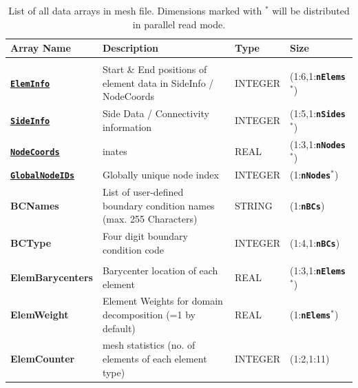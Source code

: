 \documentclass[a4paper,headsepline]{scrreprt}
\newcommand\ttbf[1]{\textbf{\texttt{#1}}}
\newcommand\ElemInfo{\hyperlink{ElemInfo}{\ttbf{ElemInfo}}}
\newcommand\SideInfo{\hyperlink{SideInfo}{\ttbf{SideInfo}}}
\newcommand\NodeCoords{\hyperlink{NodeInfo}{\ttbf{NodeCoords}}}
\newcommand\GlobalNodeIDs{\hyperlink{NodeInfo}{\ttbf{GlobalNodeIDs}}}
\newcommand\nElems{\ttbf{nElems}}
\newcommand\nSides{\ttbf{nSides}}
\newcommand\nNodes{\ttbf{nNodes}}
\newcommand\nBCs{\ttbf{nBCs}}
\begin{document}
\begin{table}[h!]
\centering
\begin{tabularx}{1.0\textwidth}{|>{\bfseries\ttfamily}l|X|l|l|} \hline
\normalfont \textbf{Array Name}  & \textbf{Description}                         & \textbf{Type} & \textbf{Size}        \\ \hline \hline
\multicolumn{4}{|l|}{\normalfont \textit{Main information:}} \\\hline
\ElemInfo        & Start \& End positions of element data in SideInfo / NodeCoords     & INTEGER & (1:6,1:\nElems$^*$) \\\hline
\SideInfo        & Side Data / Connectivity information                    & INTEGER   & (1:5,1:\nSides$^*$)           \\\hline
\NodeCoords      & inates                                        & REAL      & (1:3,1:\nNodes$^*$)           \\\hline
\GlobalNodeIDs   & Globally unique node index                              & INTEGER   & (1:\nNodes$^*$)           \\\hline
BCNames         & List of user-defined boundary condition names (max. 255 Characters)& STRING    & (1:\nBCs)               \\\hline
BCType          & Four digit boundary condition code                      & INTEGER   & (1:4,1:\nBCs)             \\\hline
\multicolumn{4}{|l|}{\normalfont \textit{Additional information:}} \\\hline
ElemBarycenters & Barycenter location of each element                   & REAL      & (1:3,1:\nElems$^*$)           \\\hline
ElemWeight      & Element Weights for domain decomposition (=1 by default)& REAL      & (1:\nElems$^*$)             \\\hline
ElemCounter     & mesh statistics (no. of elements of each element type)  & INTEGER   & (1:2,1:11)           \\\hline
\end{tabularx}
\caption{List of all data arrays in mesh file. Dimensions marked with $^*$ will be distributed in parallel read mode. }
\end{table}


\clearpage
\end{document}
